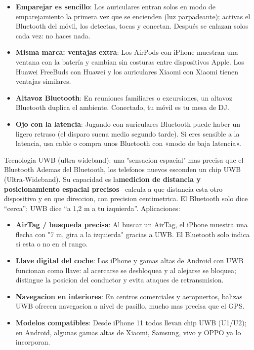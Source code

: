 \begin{itemize}
  \item \textbf{Emparejar es sencillo}: Los auriculares entran solos en modo de emparejamiento la primera vez que se encienden (luz parpadeante); activas el Bluetooth del móvil, los detectas, tocas y conectan. Después se enlazan solos cada vez: no haces nada.
  \item \textbf{Misma marca: ventajas extra}: Los AirPods con iPhone muestran una ventana con la batería y cambian sin costuras entre dispositivos Apple. Los Huawei FreeBuds con Huawei y los auriculares Xiaomi con Xiaomi tienen ventajas similares.
  \item \textbf{Altavoz Bluetooth}: En reuniones familiares o excursiones, un altavoz Bluetooth duplica el ambiente. Conectado, tu móvil es tu mesa de DJ.
  \item \textbf{Ojo con la latencia}: Jugando con auriculares Bluetooth puede haber un ligero retraso (el disparo suena medio segundo tarde). Si eres sensible a la latencia, usa cable o compra unos Bluetooth con «modo de baja latencia».
\end{itemize}

\begin{tcbinfo}{Tecnologia UWB (ultra wideband): una "sensacion espacial" mas precisa que el Bluetooth}
Ademas del Bluetooth, los telefonos nuevos esconden un chip UWB (Ultra-Wideband). Su capacidad es la\textbf{medicion de distancia y posicionamiento espacial precisos}-- calcula a que distancia esta otro dispositivo y en que direccion, con precision centimetrica. El Bluetooth solo dice “cerca”; UWB dice “a 1,2 m a tu izquierda”. Aplicaciones:

\begin{itemize}
  \item \textbf{AirTag / busqueda precisa}: Al buscar un AirTag, el iPhone muestra una flecha con "7 m, gira a la izquierda" gracias a UWB. El Bluetooth solo indica si esta o no en el rango.
  \item \textbf{Llave digital del coche}: Los iPhone y gamas altas de Android con UWB funcionan como llave: al acercarse se desbloquea y al alejarse se bloquea; distingue la posicion del conductor y evita ataques de retransmision.
  \item \textbf{Navegacion en interiores}: En centros comerciales y aeropuertos, balizas UWB ofrecen navegacion a nivel de pasillo, mucho mas precisa que el GPS.
  \item \textbf{Modelos compatibles}: Desde iPhone 11 todos llevan chip UWB (U1/U2); en Android, algunas gamas altas de Xiaomi, Samsung, vivo y OPPO ya lo incorporan.
\end{itemize}

\end{tcbinfo}

